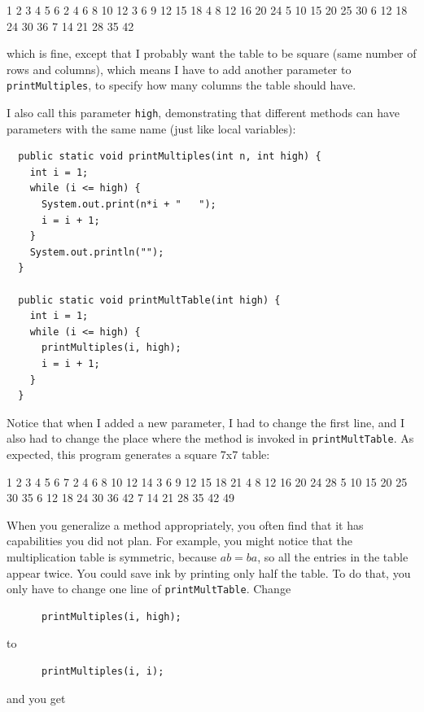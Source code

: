 \documentclass[12pt]{book}
\theoremstyle{exercise}
\begin{document}
\begin{verbatimtab}
1   2   3   4   5   6
2   4   6   8   10   12
3   6   9   12   15   18
4   8   12   16   20   24
5   10   15   20   25   30
6   12   18   24   30   36
7   14   21   28   35   42
\end{verbatimtab}
%
which is fine, except that I probably want the table to
be square (same number of rows and columns), which means
I have to add another parameter to {\tt printMultiples},
to specify how many columns the table should have.

I also call this parameter {\tt high},
demonstrating that different methods can have parameters
with the same name (just like local variables):

\begin{lstlisting}
  public static void printMultiples(int n, int high) {
    int i = 1;
    while (i <= high) {
      System.out.print(n*i + "   ");
      i = i + 1;
    }
    System.out.println("");
  }

  public static void printMultTable(int high) {
    int i = 1;
    while (i <= high) {
      printMultiples(i, high);
      i = i + 1;
    }
  }
\end{lstlisting}
%
Notice that when I added a new parameter, I had to change the first
line, and I also had to
change the place where the method is invoked in {\tt printMultTable}.
As expected, this program generates a square 7x7 table:

\begin{verbatimtab}
1   2   3   4   5   6   7
2   4   6   8   10   12   14
3   6   9   12   15   18   21
4   8   12   16   20   24   28
5   10   15   20   25   30   35
6   12   18   24   30   36   42
7   14   21   28   35   42   49
\end{verbatimtab}
%
When you generalize a method appropriately, you often find
that it has capabilities you did not plan.
For example, you might notice that the multiplication table
is symmetric, because $ab = ba$, so all the entries in the
table appear twice.  You could save ink by printing only
half the table.  To do that, you only have to change one
line of {\tt printMultTable}.  Change

\begin{lstlisting}
      printMultiples(i, high);
\end{lstlisting}
%
to

\begin{lstlisting}
      printMultiples(i, i);
\end{lstlisting}
%
and you get
\end{document}
